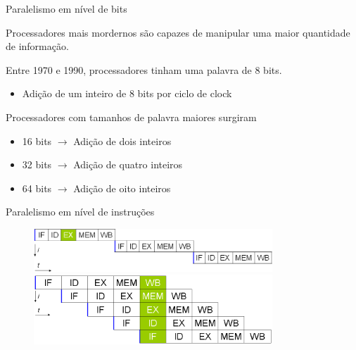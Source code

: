 \documentclass[compress]{beamer}
\begin{document}

\begin{frame}{Paralelismo em nível de bits}

Processadores mais mordernos são capazes de manipular uma maior quantidade de informação.

\vspace{1cm}

Entre 1970 e 1990, processadores tinham uma palavra de 8 bits.
\begin{itemize}
    \item Adição de um inteiro de 8 bits por ciclo de clock
\end{itemize}

\vspace{1cm}

Processadores com tamanhos de palavra maiores surgiram
\begin{itemize}
    \item 16 bits $\rightarrow$ Adição de dois inteiros
    \item 32 bits $\rightarrow$ Adição de quatro inteiros
    \item 64 bits $\rightarrow$ Adição de oito inteiros
\end{itemize}

\end{frame}


\begin{frame}{Paralelismo em nível de instruções}

\vspace{1cm}

\begin{figure}
    \begin{overprint}
    \centering\includegraphics[width=0.80\textwidth]{images/serial.png}
    \centering\includegraphics[width=0.80\textwidth]{images/pipeline.png}
    \end{overprint}
\end{figure}

\end{frame}
\end{document}
